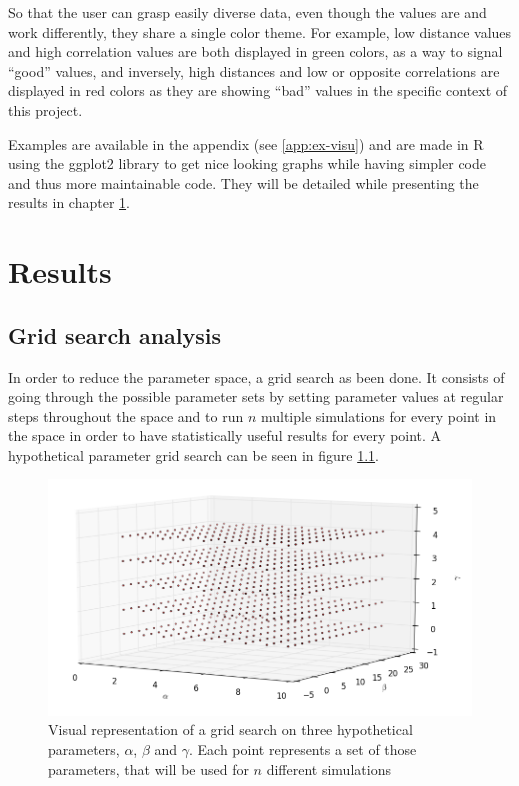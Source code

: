 \documentclass[a4paper,12pt]{report}
\begin{document}
So that the user can grasp easily diverse data, even though the values are and work differently, they share a single color theme. For example, low distance values and high correlation values are both displayed in green colors, as a way to signal “good” values, and inversely, high distances and low or opposite correlations are displayed in red colors as they are showing “bad” values in the specific context of this project.

Examples are available in the appendix (see \ref{app:ex-visu}) and are made in R using the ggplot2 library \cite{Wic01} to get nice looking graphs while having simpler code and thus more maintainable code. They will be detailed while presenting the results in chapter \ref{chapter-results}.


\chapter{Results}
\label{chapter-results}
\section{Grid search analysis}
In order to reduce the parameter space, a grid search as been done. It consists of going through the possible parameter sets by setting parameter values at regular steps throughout the space and to run $n$ multiple simulations for every point in the space in order to have statistically useful results for every point. A hypothetical parameter grid search can be seen in figure \ref{grid}.

\begin{figure}[h]
	\centering
	\includegraphics[scale=0.5]{../data/grid.png}
	\caption{Visual representation of a grid search on three hypothetical parameters, $\alpha$, $\beta$ and $\gamma$. Each point represents a set of those parameters, that will be used for $n$ different simulations}
	\label{grid}
\end{figure}
\end{document}
